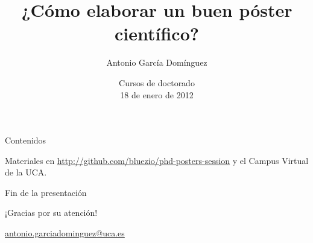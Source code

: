 \documentclass[xcolor=svgnames]{beamer}
\title[Pósters científicos]{¿Cómo elaborar un buen póster científico?}
\author{Antonio García Domínguez}
\date{Cursos de doctorado \\ \small 18 de enero de 2012}
\institute{Universidad de Cádiz \\\vspace{2em} \texttt{[image: cc-by-sa]}}
\begin{document}
\begin{frame}
  \titlepage
\end{frame}

\begin{frame}{Contenidos}
  \tableofcontents[hideallsubsections]

  Materiales en \url{http://github.com/bluezio/phd-posters-session} y
  el Campus Virtual de la UCA.
\end{frame}

\appendix

\begin{frame}{Fin de la presentación}
  \begin{center}
    {\Huge ¡Gracias por su atención!}

    \vspace{3em}

    {\Large
      \href{mailto:antonio.garciadominguez@uca.es}{antonio.garciadominguez@uca.es}}
  \end{center}
\end{frame}
\end{document}
